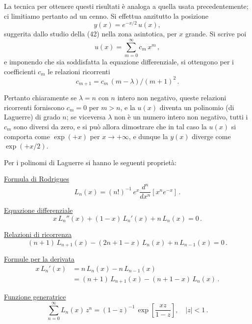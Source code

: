 \documentclass[11pt, a4paper]{book}
\numberwithin{equation}{section}
\begin{document}

La tecnica per ottenere questi risultati è analoga a quella
usata precedentemente; ci limitiamo pertanto ad un cenno.
Si effettua anzitutto la posizione
\[
y(x) = e^{-x/2}\, u(x),
\]
suggerita dallo studio della (42) nella zona asintotica, per $x$ grande.
Si scrive poi
\[
u(x) = \sum_{m=0}^{\infty} c_m\, x^m \,,
\]
e imponendo che sia soddisfatta la equazione differenziale, si ottengono per i coefficienti $c_m$ le relazioni ricorrenti
\[
c_{m+1} = c_m\, (m - \lambda) / (m+1)^2 \,.
\]

Pertanto chiaramente se $\lambda = n$ con $n$ intero non negativo,
queste relazioni ricorrenti forniscono $c_m = 0$ per $m > n$, e
la $u(x)$ diventa un polinomio (di Laguerre) di grado $n$; se viceversa
$\lambda$ non è un numero intero non negativo, tutti i $c_m$ sono diversi
da zero, e si può allora dimostrare che in tal caso la $u(x)$ si comporta
come $\exp(+x)$ per $x \to +\infty$, e dunque la $y(x)$ diverge come
$\exp(+x/2)$.

Per i polinomi di Laguerre si hanno le seguenti proprietà:

\medskip
\noindent\uline{Formula di Rodrigues}
\begin{equation}
L_n(x) = (n!)^{-1}\, e^x \frac{d^n}{dx^n} \left[ x^n e^{-x} \right] \,. \tag{47}
\end{equation}

\medskip
\noindent\uline{Equazione differenziale}
\begin{equation}
x\, L_n''(x) + (1-x)\, L_n'(x) + n\, L_n(x) = 0 \,. \tag{48}
\end{equation}

\medskip
\noindent\uline{Relazioni di ricorrenza}
\begin{equation}
(n+1)\, L_{n+1}(x) - (2n+1-x)\, L_n(x) + n\, L_{n-1}(x) = 0 \,. \tag{49}
\end{equation}

\medskip
\noindent\uline{Formule per la derivata}
\begin{align}
x\, L_n'(x) &= n\, L_n(x) - n\, L_{n-1}(x) \tag{50a} \\
&= (n+1)\, L_{n+1}(x) - (n+1-x)\, L_n(x) \,. \tag{50b}
\end{align}

\medskip
\noindent\uline{Funzione generatrice}
\begin{equation}
\sum_{n=0}^{\infty} L_n(x)\, z^n = (1-z)^{-1}\, \exp\!\left[\frac{xz}{1-z}\right], \quad |z| < 1 \,. \tag{51}
\end{equation}
\end{document}
